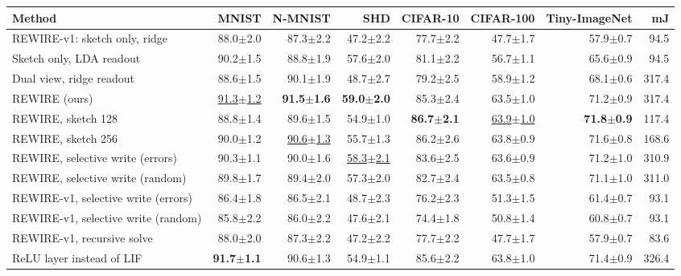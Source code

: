 \begin{tabular}{lrrrrrrr}
\toprule
Method & MNIST & N-MNIST & SHD & CIFAR-10 & CIFAR-100 & Tiny-ImageNet & mJ \\
\midrule
REWIRE-v1: sketch only, ridge & 88.0{\tiny$\pm$2.0} & 87.3{\tiny$\pm$2.2} & 47.2{\tiny$\pm$2.2} & 77.7{\tiny$\pm$2.2} & 47.7{\tiny$\pm$1.7} & 57.9{\tiny$\pm$0.7} & 94.5 \\
Sketch only, LDA readout & 90.2{\tiny$\pm$1.5} & 88.8{\tiny$\pm$1.9} & 57.6{\tiny$\pm$2.0} & 81.1{\tiny$\pm$2.2} & 56.7{\tiny$\pm$1.1} & 65.6{\tiny$\pm$0.9} & 94.5 \\
Dual view, ridge readout & 88.6{\tiny$\pm$1.5} & 90.1{\tiny$\pm$1.9} & 48.7{\tiny$\pm$2.7} & 79.2{\tiny$\pm$2.5} & 58.9{\tiny$\pm$1.2} & 68.1{\tiny$\pm$0.6} & 317.4 \\
REWIRE (ours) & \underline{91.3{\tiny$\pm$1.2}} & \textbf{91.5{\tiny$\pm$1.6}} & \textbf{59.0{\tiny$\pm$2.0}} & 85.3{\tiny$\pm$2.4} & 63.5{\tiny$\pm$1.0} & 71.2{\tiny$\pm$0.9} & 317.4 \\
REWIRE, sketch 128 & 88.8{\tiny$\pm$1.4} & 89.6{\tiny$\pm$1.5} & 54.9{\tiny$\pm$1.0} & \textbf{86.7{\tiny$\pm$2.1}} & \underline{63.9{\tiny$\pm$1.0}} & \textbf{71.8{\tiny$\pm$0.9}} & 117.4 \\
REWIRE, sketch 256 & 90.0{\tiny$\pm$1.2} & \underline{90.6{\tiny$\pm$1.3}} & 55.7{\tiny$\pm$1.3} & 86.2{\tiny$\pm$2.6} & 63.8{\tiny$\pm$0.9} & 71.6{\tiny$\pm$0.8} & 168.6 \\
REWIRE, selective write (errors) & 90.3{\tiny$\pm$1.1} & 90.0{\tiny$\pm$1.6} & \underline{58.3{\tiny$\pm$2.1}} & 83.6{\tiny$\pm$2.5} & 63.6{\tiny$\pm$0.9} & 71.2{\tiny$\pm$1.0} & 310.9 \\
REWIRE, selective write (random) & 89.8{\tiny$\pm$1.7} & 89.4{\tiny$\pm$2.0} & 57.3{\tiny$\pm$2.0} & 82.7{\tiny$\pm$2.4} & 63.5{\tiny$\pm$0.8} & 71.1{\tiny$\pm$1.0} & 311.0 \\
REWIRE-v1, selective write (errors) & 86.4{\tiny$\pm$1.8} & 86.5{\tiny$\pm$2.1} & 48.7{\tiny$\pm$2.3} & 76.2{\tiny$\pm$2.3} & 51.3{\tiny$\pm$1.5} & 61.4{\tiny$\pm$0.7} & 93.1 \\
REWIRE-v1, selective write (random) & 85.8{\tiny$\pm$2.2} & 86.0{\tiny$\pm$2.2} & 47.6{\tiny$\pm$2.1} & 74.4{\tiny$\pm$1.8} & 50.8{\tiny$\pm$1.4} & 60.8{\tiny$\pm$0.7} & 93.1 \\
REWIRE-v1, recursive solve & 88.0{\tiny$\pm$2.0} & 87.3{\tiny$\pm$2.2} & 47.2{\tiny$\pm$2.2} & 77.7{\tiny$\pm$2.2} & 47.7{\tiny$\pm$1.7} & 57.9{\tiny$\pm$0.7} & 83.6 \\
ReLU layer instead of LIF & \textbf{91.7{\tiny$\pm$1.1}} & 90.6{\tiny$\pm$1.3} & 54.9{\tiny$\pm$1.1} & 85.6{\tiny$\pm$2.2} & 63.8{\tiny$\pm$1.0} & 71.4{\tiny$\pm$0.9} & 326.4 \\

\end{tabular}

